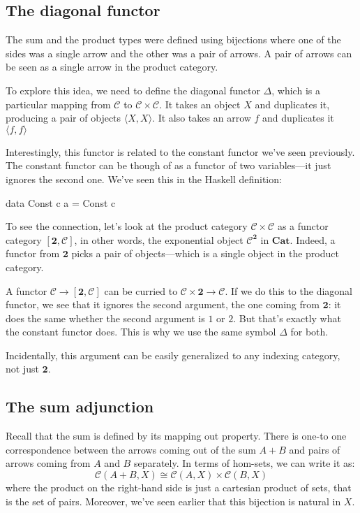 \documentclass[DaoFP]{subfiles}
\begin{document}
\subsection{The diagonal functor}

The sum and the product types were defined using bijections where one of the sides was a single arrow and the other was a pair of arrows. A pair of arrows can be seen as a single arrow in the product category. 

To explore this idea, we need to define the diagonal functor $\Delta$, which is a particular mapping from $\mathcal{C}$ to $\mathcal{C} \times \mathcal{C}$. It takes an object $X$ and duplicates it, producing a pair of objects $\langle X, X \rangle$. It also takes an arrow $f$ and duplicates it $\langle f, f \rangle$

Interestingly, this functor is related to the constant functor we've seen previously. The constant functor can be though of as a functor of two variables---it just ignores the second one. We've seen this in the Haskell definition:
\begin{haskell}
data Const c a = Const c
\end{haskell}

To see the connection, let's look at the product category $\mathcal{C} \times \mathcal{C}$ as a functor category $[ \mathbf{2}, \mathcal{C}]$, in other words, the exponential object $\mathcal{C}^{ \mathbf{2}}$ in $\mathbf{Cat}$. Indeed, a functor from $\mathbf{2}$ picks a pair of objects---which is a single object in the product category.


A functor $\mathcal{C} \to [\mathbf{2}, \mathcal{C}]$ can be curried to $\mathcal{C} \times \mathbf{2} \to  \mathcal{C}$. If we do this to the diagonal functor, we see that it ignores the second argument, the one coming from $\mathbf{2}$: it does the same whether the second argument is $1$ or $2$. But that's exactly what the constant functor does. This is why we use the same symbol $\Delta$ for both.

Incidentally, this argument can be easily generalized to any indexing category, not just $\mathbf{2}$.

\subsection{The sum adjunction}

Recall that the sum is defined by its mapping out property. There is one-to one correspondence between the arrows coming out of the sum $A + B$ and pairs of arrows coming from $A$ and $B$ separately. In terms of hom-sets, we can write it as:
\[  \mathcal{C} (A + B, X) \cong \mathcal{C}( A , X) \times \mathcal{C}( B , X)\]
where the product on the right-hand side is just a cartesian product of sets, that is the set of pairs. Moreover, we've seen earlier that this bijection is natural in $X$.
\end{document}

